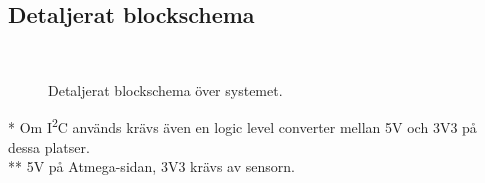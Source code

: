 \documentclass[a4paper,11pt]{article}
\begin{document}
\newpage
\begin{appendices}
\chapter{Detaljerat blockschema}
\\%
\begin{figure}[h!]
    \caption{Detaljerat blockschema över systemet.}
    \label{fig:modulesDetailed}
\end{figure}
* Om I\textsuperscript{2}C används krävs även en logic level converter mellan 5V och 3V3 på dessa platser.\\
** 5V på Atmega-sidan, 3V3 krävs av sensorn.

\end{appendices}
\end{document}
